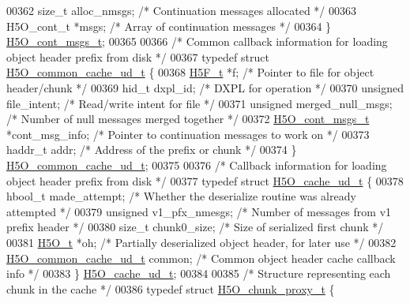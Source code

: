 \begin{DoxyCode}
00362     \textcolor{keywordtype}{size\_t}  alloc\_nmsgs;        \textcolor{comment}{/* Continuation messages allocated */}
00363     H5O\_cont\_t *msgs;           \textcolor{comment}{/* Array of continuation messages */}
00364 \} \hyperlink{struct_h5_o__cont__msgs__t}{H5O\_cont\_msgs\_t};
00365 
00366 \textcolor{comment}{/* Common callback information for loading object header prefix from disk */}
00367 \textcolor{keyword}{typedef} \textcolor{keyword}{struct }\hyperlink{struct_h5_o__common__cache__ud__t}{H5O\_common\_cache\_ud\_t} \{
00368     \hyperlink{struct_h5_f__t}{H5F\_t} *f;                           \textcolor{comment}{/* Pointer to file for object header/chunk */}
00369     hid\_t dxpl\_id;                      \textcolor{comment}{/* DXPL for operation */}
00370     \textcolor{keywordtype}{unsigned} file\_intent;               \textcolor{comment}{/* Read/write intent for file */}
00371     \textcolor{keywordtype}{unsigned} merged\_null\_msgs;          \textcolor{comment}{/* Number of null messages merged together */}
00372     \hyperlink{struct_h5_o__cont__msgs__t}{H5O\_cont\_msgs\_t} *cont\_msg\_info;     \textcolor{comment}{/* Pointer to continuation messages to work on */}
00373     haddr\_t addr;                       \textcolor{comment}{/* Address of the prefix or chunk */}
00374 \} \hyperlink{struct_h5_o__common__cache__ud__t}{H5O\_common\_cache\_ud\_t};
00375 
00376 \textcolor{comment}{/* Callback information for loading object header prefix from disk */}
00377 \textcolor{keyword}{typedef} \textcolor{keyword}{struct }\hyperlink{struct_h5_o__cache__ud__t}{H5O\_cache\_ud\_t} \{
00378     hbool\_t made\_attempt;               \textcolor{comment}{/* Whether the deserialize routine was already attempted */}
00379     \textcolor{keywordtype}{unsigned} v1\_pfx\_nmesgs;             \textcolor{comment}{/* Number of messages from v1 prefix header */}
00380     \textcolor{keywordtype}{size\_t} chunk0\_size;                 \textcolor{comment}{/* Size of serialized first chunk    */}
00381     \hyperlink{struct_h5_o__t}{H5O\_t} *oh;                          \textcolor{comment}{/* Partially deserialized object header, for later use */}
00382     \hyperlink{struct_h5_o__common__cache__ud__t}{H5O\_common\_cache\_ud\_t} common;       \textcolor{comment}{/* Common object header cache callback info */}
00383 \} \hyperlink{struct_h5_o__cache__ud__t}{H5O\_cache\_ud\_t};
00384 
00385 \textcolor{comment}{/* Structure representing each chunk in the cache */}
00386 \textcolor{keyword}{typedef} \textcolor{keyword}{struct }\hyperlink{struct_h5_o__chunk__proxy__t}{H5O\_chunk\_proxy\_t} \{

\end{DoxyCode}
